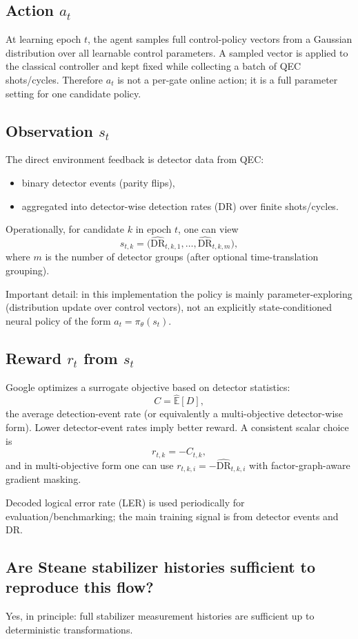 \documentclass[11pt]{article}
\begin{document}
\subsection*{Action $a_t$}
At learning epoch $t$, the agent samples full control-policy vectors from a Gaussian distribution over all learnable control parameters. A sampled vector is applied to the classical controller and kept fixed while collecting a batch of QEC shots/cycles. Therefore $a_t$ is not a per-gate online action; it is a full parameter setting for one candidate policy.

\subsection*{Observation $s_t$}
The direct environment feedback is detector data from QEC:
\begin{itemize}
\item binary detector events (parity flips),
\item aggregated into detector-wise detection rates (DR) over finite shots/cycles.
\end{itemize}
Operationally, for candidate $k$ in epoch $t$, one can view
\[
s_{t,k}=\big(\widehat{\mathrm{DR}}_{t,k,1},\ldots,\widehat{\mathrm{DR}}_{t,k,m}\big),
\]
where $m$ is the number of detector groups (after optional time-translation grouping).

Important detail: in this implementation the policy is mainly parameter-exploring (distribution update over control vectors), not an explicitly state-conditioned neural policy of the form $a_t=\pi_\theta(s_t)$.

\subsection*{Reward $r_t$ from $s_t$}
Google optimizes a surrogate objective based on detector statistics:
\[
C=\hat{\mathbb{E}}[D],
\]
the average detection-event rate (or equivalently a multi-objective detector-wise form). Lower detector-event rates imply better reward. A consistent scalar choice is
\[
r_{t,k}=-C_{t,k},
\]
and in multi-objective form one can use $r_{t,k,i}=-\widehat{\mathrm{DR}}_{t,k,i}$ with factor-graph-aware gradient masking.

Decoded logical error rate (LER) is used periodically for evaluation/benchmarking; the main training signal is from detector events and DR.

\subsection*{Are Steane stabilizer histories sufficient to reproduce this flow?}
Yes, in principle: full stabilizer measurement histories are sufficient up to deterministic transformations.
\end{document}
